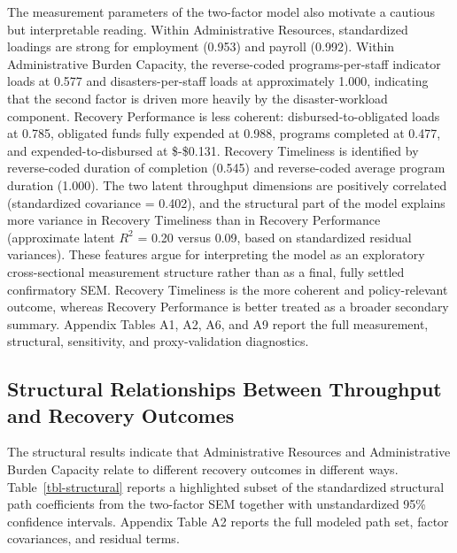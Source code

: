 \documentclass[
  number]{elsarticle}
\begin{document}
The measurement parameters of the two-factor model also motivate a
cautious but interpretable reading. Within Administrative Resources,
standardized loadings are strong for employment (0.953) and payroll
(0.992). Within Administrative Burden Capacity, the reverse-coded
programs-per-staff indicator loads at 0.577 and disasters-per-staff
loads at approximately 1.000, indicating that the second factor is
driven more heavily by the disaster-workload component. Recovery
Performance is less coherent: disbursed-to-obligated loads at 0.785,
obligated funds fully expended at 0.988, programs completed at 0.477,
and expended-to-disbursed at \$-\$0.131. Recovery Timeliness is
identified by reverse-coded duration of completion (0.545) and
reverse-coded average program duration (1.000). The two latent
throughput dimensions are positively correlated (standardized covariance
= 0.402), and the structural part of the model explains more variance in
Recovery Timeliness than in Recovery Performance (approximate latent
\(R^2\) = 0.20 versus 0.09, based on standardized residual variances).
These features argue for interpreting the model as an exploratory
cross-sectional measurement structure rather than as a final, fully
settled confirmatory SEM. Recovery Timeliness is the more coherent and
policy-relevant outcome, whereas Recovery Performance is better treated
as a broader secondary summary. Appendix Tables A1, A2, A6, and A9
report the full measurement, structural, sensitivity, and
proxy-validation diagnostics.

\subsection{Structural Relationships Between Throughput and Recovery
Outcomes}\label{structural-relationships-between-throughput-and-recovery-outcomes}

The structural results indicate that Administrative Resources and
Administrative Burden Capacity relate to different recovery outcomes in
different ways. Table~\ref{tbl-structural} reports a highlighted subset
of the standardized structural path coefficients from the two-factor SEM
together with unstandardized 95\% confidence intervals. Appendix Table
A2 reports the full modeled path set, factor covariances, and residual
terms.
\end{document}
